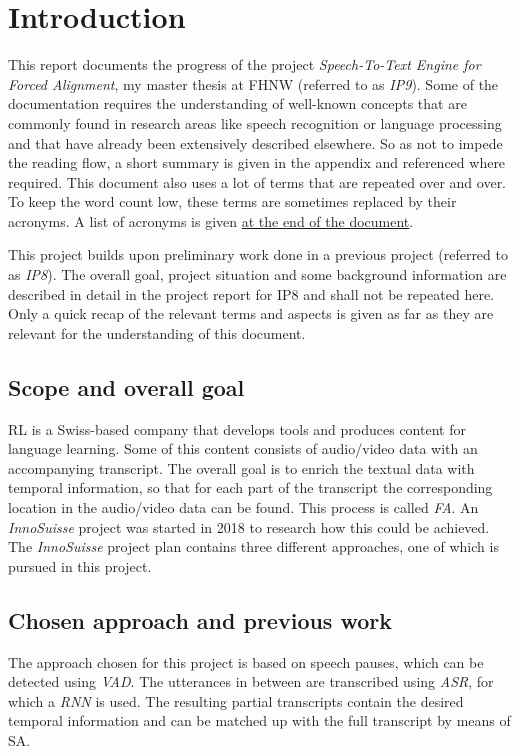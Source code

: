 \section{Introduction}\label{intro}
This report documents the progress of the project \textit{Speech-To-Text Engine for Forced Alignment}, my master thesis at \ac{FHNW} (referred to as \textit{IP9}). Some of the documentation requires the understanding of well-known concepts that are commonly found in research areas like speech recognition or language processing and that have already been extensively described elsewhere. So as not to impede the reading flow, a short summary is given in the appendix and referenced where required. This document also uses a lot of terms that are repeated over and over. To keep the word count low, these terms are sometimes replaced by their acronyms. A list of acronyms is given \hyperref[acronyms]{at the end of the document}. 

This project builds upon preliminary work done in a previous project (referred to as \textit{IP8}). The overall goal, project situation and some background information are described in detail in the project report for IP8 and shall not be repeated here. Only a quick recap of the relevant terms and aspects is given as far as they are relevant for the understanding of this document.

\subsection{Scope and overall goal}
\ac{RL} is a Swiss-based company that develops tools and produces content for language learning. Some of this content consists of audio/video data with an accompanying transcript. The overall goal is to enrich the textual data with temporal information, so that for each part of the transcript the corresponding location in the audio/video data can be found. This process is called \textit{\ac{FA}}. An \textit{InnoSuisse} project was started in 2018 to research how this could be achieved. The \textit{InnoSuisse} project plan contains three different approaches, one of which is pursued in this project.

\subsection{Chosen approach and previous work}
The approach chosen for this project is based on speech pauses, which can be detected using \textit{\ac{VAD}}. The utterances in between are transcribed using \textit{\ac{ASR}}, for which a \textit{\ac{RNN}} is used. The resulting partial transcripts contain the desired temporal information and can be matched up with the full transcript by means of \ac{SA}.

